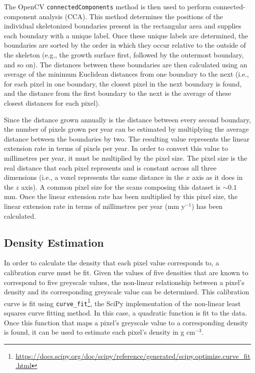 The OpenCV \texttt{connectedComponents} method is then used to perform connected-component analysis (CCA). This method determines the positions of the individual skeletonized boundaries present in the rectangular area and supplies each boundary with a unique label. Once these unique labels are determined, the boundaries are sorted by the order in which they occur relative to the outside of the skeleton (e.g., the growth surface first, followed by the outermost boundary, and so on). The distances between these boundaries are then calculated using an average of the minimum Euclidean distances from one boundary to the next (i.e., for each pixel in one boundary, the closest pixel in the next boundary is found, and the distance from the first boundary to the next is the average of these closest distances for each pixel). 

Since the distance grown annually is the distance between every second boundary, the number of pixels grown per year can be estimated by multiplying the average distance between the boundaries by two. The resulting value represents the linear extension rate in terms of pixels per year. In order to convert this value to millimetres per year, it must be multiplied by the pixel size. The pixel size is the real distance that each pixel represents and is constant across all three dimensions (i.e., a voxel represents the same distance in the $x$ axis as it does in the $z$ axis). A common pixel size for the scans composing this dataset is ${\sim}0.1$ mm. Once the linear extension rate has been multiplied by this pixel size, the linear extension rate in terms of millimetres per year (mm y$^{-1}$) has been calculated.

\subsection{Density Estimation}

In order to calculate the density that each pixel value corresponds to, a calibration curve must be fit. Given the values of five densities that are known to correspond to five greyscale values, the non-linear relationship between a pixel's density and its corresponding greyscale value can be determined. This calibration curve is fit using \texttt{curve\_fit}\footnote{\url{https://docs.scipy.org/doc/scipy/reference/generated/scipy.optimize.curve_fit.html}}, the SciPy implementation of the non-linear least squares curve fitting method. In this case, a quadratic function is fit to the data. Once this function that maps a pixel's greyscale value to a corresponding density is found, it can be used to estimate each pixel's density in g cm$^{-3}$.

